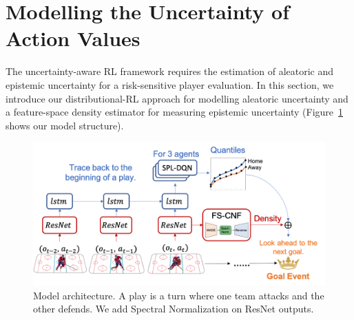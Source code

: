 \documentclass[letterpaper]{article} %
\begin{document}
\section{Modelling the Uncertainty of Action Values }\label{Sec:action-value-function}
The uncertainty-aware RL framework requires the estimation of aleatoric and epistemic uncertainty for a risk-sensitive player evaluation. In this section, we introduce our distributional-RL approach for modelling aleatoric uncertainty and a feature-space density estimator for measuring epistemic uncertainty (Figure~\ref{fig:model-architecture} shows our model structure).
\begin{figure}[htbp]
\vspace{-0.1in}
\includegraphics[scale=0.4]{figures/ice-hockey-net.png}
\vspace{-0.2in}
\caption{Model architecture. A play is a turn where one team attacks and the other defends. We add Spectral Normalization on ResNet outputs.}
\label{fig:model-architecture}
\vspace{-0.1in}
\end{figure}
\end{document}

